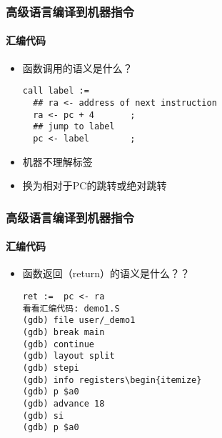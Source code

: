\begin{frame}[fragile]
\frametitle{高级语言编译到机器指令}
\framesubtitle{汇编代码}
	
\begin{itemize}
	
	\item 函数调用的语义是什么？	


\begin{block}{}
\begin{verbatim}
call label :=
  ## ra <- address of next instruction
  ra <- pc + 4       ;
  ## jump to label
  pc <- label        ; 
\end{verbatim}
\end{block}  
\item 机器不理解标签
\item 换为相对于PC的跳转或绝对跳转	
\end{itemize}

\end{frame}




\begin{frame}[fragile]
	\frametitle{高级语言编译到机器指令}
	\framesubtitle{汇编代码}
	
	\begin{itemize}
		
		\item 函数返回（return）的语义是什么？？	
		
		
\begin{block}{}
\begin{verbatim}
ret :=  pc <- ra
看看汇编代码: demo1.S
(gdb) file user/_demo1
(gdb) break main
(gdb) continue
(gdb) layout split
(gdb) stepi
(gdb) info registers\begin{itemize}
(gdb) p $a0
(gdb) advance 18
(gdb) si
(gdb) p $a0
\end{verbatim}
\end{block}  

	\end{itemize}
	
\end{frame}



